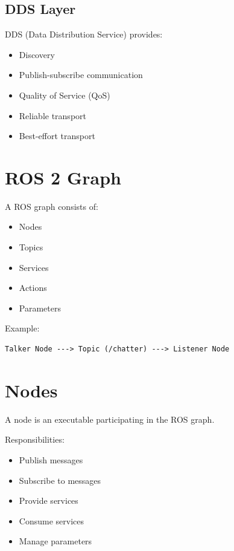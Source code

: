 \documentclass[11pt]{article}
\begin{document}
\subsection{DDS Layer}

DDS (Data Distribution Service) provides:

\begin{itemize}
\item Discovery
\item Publish-subscribe communication
\item Quality of Service (QoS)
\item Reliable transport
\item Best-effort transport
\end{itemize}

\section{ROS 2 Graph}

A ROS graph consists of:

\begin{itemize}
\item Nodes
\item Topics
\item Services
\item Actions
\item Parameters
\end{itemize}

Example:

\begin{verbatim}
Talker Node ---> Topic (/chatter) ---> Listener Node
\end{verbatim}

\section{Nodes}

A node is an executable participating in the ROS graph.

Responsibilities:

\begin{itemize}
\item Publish messages
\item Subscribe to messages
\item Provide services
\item Consume services
\item Manage parameters
\end{itemize}
\end{document}
